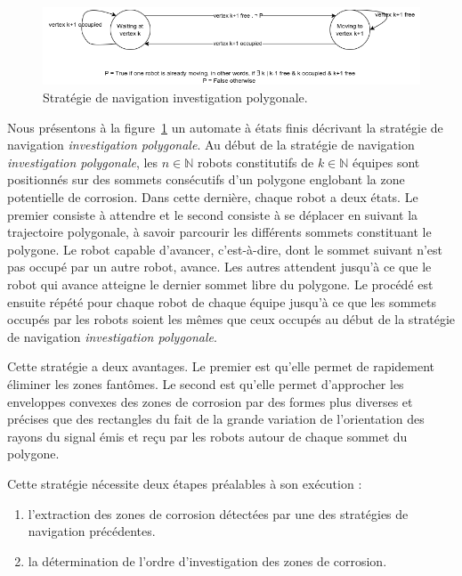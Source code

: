 \documentclass[francais,RandD]{rapportPFE}
\begin{document}
				\begin{figure}[h!]
					\centering
					\includegraphics[scale=0.6]{graphics/automat_poly.png}
					\caption{Stratégie de navigation investigation polygonale.}
					\label{fig:automat}
				\end{figure}

				Nous présentons à la figure~\ref{fig:automat} un automate à états finis décrivant la stratégie de navigation \textit{investigation polygonale}.
				Au début de la stratégie de navigation \textit{investigation polygonale}, les $n \in \mathbb{N}$ robots constitutifs de $k \in \mathbb{N}$ équipes sont positionnés sur des sommets consécutifs d'un polygone englobant la zone potentielle de corrosion.
				Dans cette dernière, chaque robot a deux états.
				Le premier consiste à attendre et le second consiste à se déplacer en suivant la trajectoire polygonale, à savoir parcourir les différents sommets constituant le polygone.
				Le robot capable d'avancer, c'est-à-dire, dont le sommet suivant n'est pas occupé par un autre robot, avance.
				Les autres attendent jusqu'à ce que le robot qui avance atteigne le dernier sommet libre du polygone.
				Le procédé est ensuite répété pour chaque robot de chaque équipe jusqu'à ce que les sommets occupés par les robots soient les mêmes que ceux occupés au début de la stratégie de navigation \textit{investigation polygonale}.

				Cette stratégie a deux avantages.
				Le premier est qu'elle permet de rapidement éliminer les zones fantômes.
				Le second est qu'elle permet d'approcher les enveloppes convexes des zones de corrosion par des formes plus diverses et précises que des rectangles du fait de la grande variation de l'orientation des rayons du signal émis et reçu par les robots autour de chaque sommet du polygone.

				Cette stratégie nécessite deux étapes préalables à son exécution :
				\begin{enumerate}
					\item l'extraction des zones de corrosion détectées par une des stratégies de navigation précédentes.
					\item la détermination de l'ordre d'investigation des zones de corrosion.
				\end{enumerate}
\end{document}

